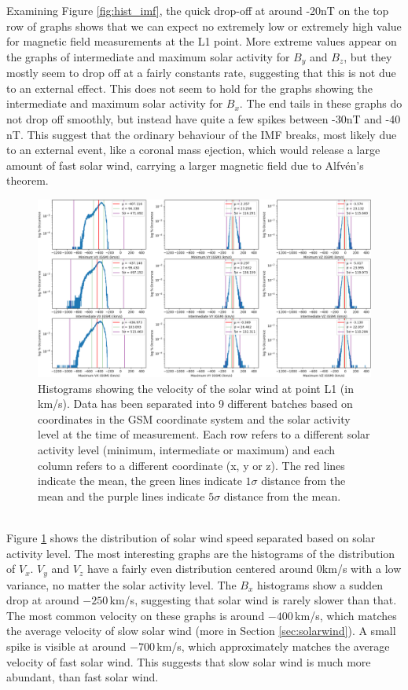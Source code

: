 \documentclass[12pt]{article}
\begin{document}
        Examining Figure \ref{fig:hist_imf}, the quick drop-off at around -20nT on the top row of graphs shows that we can expect no extremely low or extremely high value for magnetic field measurements at the L1 point. More extreme values appear on the graphs of intermediate and maximum solar activity for $B_y$ and $B_z$, but they mostly seem to drop off at a fairly constants rate, suggesting that this is not due to an external effect. This does not seem to hold for the graphs showing the intermediate and maximum solar activity for $B_x$. The end tails in these graphs do not drop off smoothly, but instead have quite a few spikes between -30nT and -40 nT. This suggest that the ordinary behaviour of the IMF breaks, most likely due to an external event, like a coronal mass ejection, which would release a large amount of fast solar wind, carrying a larger magnetic field due to Alfvén's theorem\cite{1976alfven}.\\
        \begin{figure}[t!]
            \centering
            \includegraphics[width=\textwidth]{fig_theory/hist_sw_velocity.png}
            \caption{Histograms showing the velocity of the solar wind at point L1 (in km/s). Data has been separated into 9 different batches based on coordinates in the GSM coordinate system and the solar activity level at the time of measurement. Each row refers to a different solar activity level (minimum, intermediate or maximum) and each column refers to a different coordinate (x, y or z). The red lines indicate the mean, the green lines indicate $1\sigma$ distance from the mean and the purple lines indicate $5\sigma$ distance from the mean.}
            \label{fig:hist_sw}
        \end{figure}\\
        Figure \ref{fig:hist_sw} shows the distribution of solar wind speed separated based on solar activity level. The most interesting graphs are the histograms of the distribution of $V_x$. $V_y$ and $V_z$ have a fairly even distribution centered around 0km/s with a low variance, no matter the solar activity level. The $B_x$ histograms show a sudden drop at around $-250\,$km/s, suggesting that solar wind is rarely slower than that. The most common velocity on these graphs is around $-400\,$km/s, which matches the average velocity of slow solar wind\cite{2001russell} (more in Section \ref{sec:solarwind}). A small spike is visible at around $-700\,$km/s, which approximately matches the average velocity of fast solar wind\cite{2001russell}. This suggests that slow solar wind is much more abundant, than fast solar wind.
\end{document}
